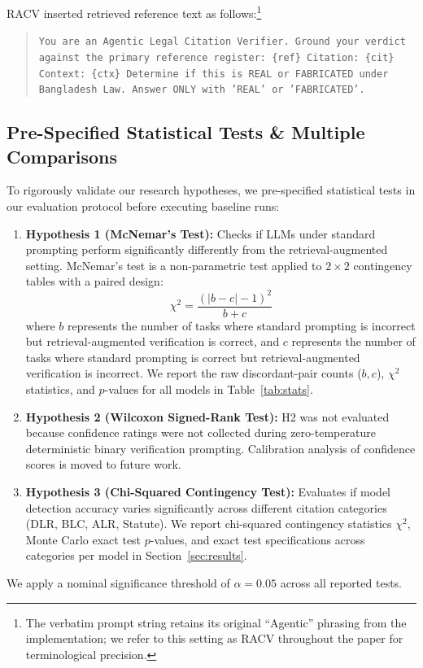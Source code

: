 \documentclass[conference]{IEEEtran}
\begin{document}
\begin{itemize}
\begin{quote}
\end{quote}
RACV inserted retrieved reference text as follows:\footnote{The verbatim prompt string retains its original ``Agentic'' phrasing from the implementation; we refer to this setting as RACV throughout the paper for terminological precision.}
\begin{quote}
\small\texttt{You are an Agentic Legal Citation Verifier. Ground your verdict against the primary reference register: \{ref\} Citation: \{cit\} Context: \{ctx\} Determine if this is REAL or FABRICATED under Bangladesh Law. Answer ONLY with 'REAL' or 'FABRICATED'.}
\end{quote}
\end{itemize}

\subsection{Pre-Specified Statistical Tests \& Multiple Comparisons}
To rigorously validate our research hypotheses, we pre-specified statistical tests in our evaluation protocol before executing baseline runs:
\begin{enumerate}
\item \textbf{Hypothesis 1 (McNemar's Test):} Checks if LLMs under standard prompting perform significantly differently from the retrieval-augmented setting. McNemar's test is a non-parametric test applied to $2 \times 2$ contingency tables with a paired design:
   \begin{equation}
   \chi^2 = \frac{(|b - c| - 1)^2}{b + c}
   \end{equation}
   where $b$ represents the number of tasks where standard prompting is incorrect but retrieval-augmented verification is correct, and $c$ represents the number of tasks where standard prompting is correct but retrieval-augmented verification is incorrect. We report the raw discordant-pair counts ($b, c$), $\chi^2$ statistics, and $p$-values for all models in Table~\ref{tab:stats}.
\item \textbf{Hypothesis 2 (Wilcoxon Signed-Rank Test):} H2 was not evaluated because confidence ratings were not collected during zero-temperature deterministic binary verification prompting. Calibration analysis of confidence scores is moved to future work.
\item \textbf{Hypothesis 3 (Chi-Squared Contingency Test):} Evaluates if model detection accuracy varies significantly across different citation categories (DLR, BLC, ALR, Statute). We report chi-squared contingency statistics $\chi^2$, Monte Carlo exact test $p$-values, and exact test specifications across categories per model in Section~\ref{sec:results}.
\end{enumerate}
We apply a nominal significance threshold of $\alpha = 0.05$ across all reported tests.
\end{document}

